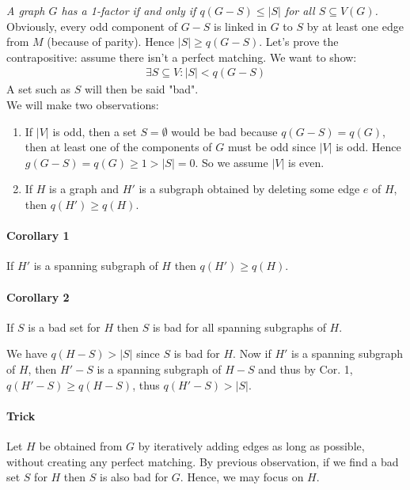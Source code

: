 \documentclass[11pt]{book}
\begin{document}
		\textit{A graph $G$ has a 1-factor if and only if $q(G - S) \leq |S|$ for all $S \subseteq V(G)$.}\\
		
		Obviously, every odd component of $G - S$ is linked in $G$ to $S$ by at least one edge from $M$ (because of parity). Hence $|S| \geq q(G - S)$. Let's prove the contrapositive: assume there isn't a perfect matching. We want to show:
			\begin{eqnarray}
				\exists S \subseteq V : |S| < q(G - S)
			\end{eqnarray} 
			A set such as $S$ will then be said "bad".\\
		
		We will make two observations:
		\begin{enumerate}
			\item If $|V|$ is odd, then a set $S = \emptyset$ would be bad because $q(G - S) = q (G)$, then at least one of the components of $G$ must be odd since $|V|$ is odd. Hence $g(G -S) = q(G) \geq 1 > |S| = 0$. So we assume $|V|$ is even.
			\item If $H$ is a graph and $H'$ is a subgraph obtained by deleting some edge $e$ of $H$, then $q(H') \geq q(H)$.
		\end{enumerate}

		\paragraph{Corollary 1} If $H'$ is a spanning subgraph of $H$ then  $q(H') \geq q(H)$.
		
		\paragraph{Corollary 2} If $S$ is a bad set for $H$ then $S$ is bad for all spanning subgraphs of $H$.
		
		We have $q(H -S) > |S|$ since $S$ is bad for $H$. Now if $H'$ is a spanning subgraph of $H$, then $H' - S$ is a spanning subgraph of $H -S$ and thus by Cor. 1, $q(H' - S) \geq q(H - S)$, thus $q(H' - S) > |S|$.
		
		\paragraph{Trick} Let $H$ be obtained from $G$ by iteratively adding edges as long as possible, without creating any perfect matching. By previous observation, if we find a bad set $S$ for $H$ then $S$ is also bad for $G$. Hence, we may focus on $H$.
		
\end{document}
